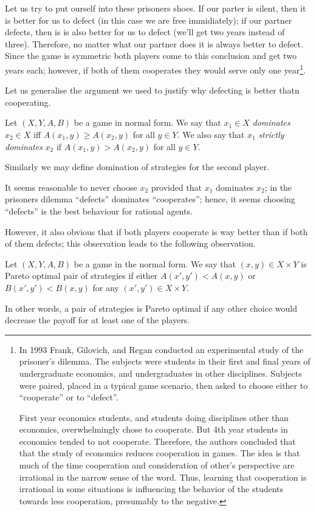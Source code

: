 Let us try to put ourself into these prisoners shoes. If our parter is silent,
then it is better for us to defect (in this case we are free immidiately); if
our partner defects, then is is also better for us to defect (we'll get two
years instead of three). Therefore, no matter what our partner does it is always
better to defect. Since the game is symmetric both players come to this
conclusion and get two years each; however, if both of them cooperates they
would serve only one year\footnote{%
  In 1993 Frank, Gilovich, and Regan conducted an experimental study of the
  prisoner's dilemma. The subjects were students in their first and final years
  of undergraduate economics, and undergraduates in other disciplines. Subjects
  were paired, placed in a typical game scenario, then asked to choose either to
  ``cooperate'' or to ``defect''. 

  First year economics students, and students doing disciplines other than
  economics, overwhelmingly chose to cooperate. But 4th year students in
  economics tended to not cooperate. Therefore, the authors concluded that
  that the study of economics reduces cooperation in games. The idea is
  that much of the time cooperation and consideration of other's perspective are
  irrational in the narrow sense of the word. Thus, learning that cooperation is
  irrational in some situations is influencing the behavior of the students
  towards less cooperation, presumably to the negative.
}.

Let us generalise the argument we used to justify why defecting is better thatn
cooperating.
\begin{definition}
  Let $(X, Y, A, B)$ be a game in normal form. We say that $x_1 \in X$
  \emph{dominates} $x_2 \in X$ iff $A(x_1, y) \ge A(x_2, y)$ for all $y \in Y$.
  We also say that $x_1$ \emph{strictly dominates} $x_2$ if $A(x_1, y) > A(x_2,
  y)$ for all $y \in Y$.

  Similarly we may define domination of strategies for the second player.
\end{definition}
It seems reasonable to never choose $x_2$ provided that $x_1$ dominates $x_2$; in
the prisoners dilemma ``defects'' dominates ``cooperates''; hence, it seems
choosing ``defects'' is the best behaviour for rational agents.

However, it also obvious that if both players cooperate is way better than if
both of them defects; this observation leads to the following observation.
\begin{exercise}
  Let $(X, Y, A, B)$  be a game in the normal form. We say that $(x, y) \in X
  \times Y$ is Pareto optimal pair of strategies if either $A(x', y') < A(x, y)$
  or $B(x', y') < B(x, y)$ for any $(x', y') \in X \times Y$.
\end{exercise}
In other words, a pair of strategies is Pareto optimal if any other choice would
decrease the payoff for at least one of the players.
